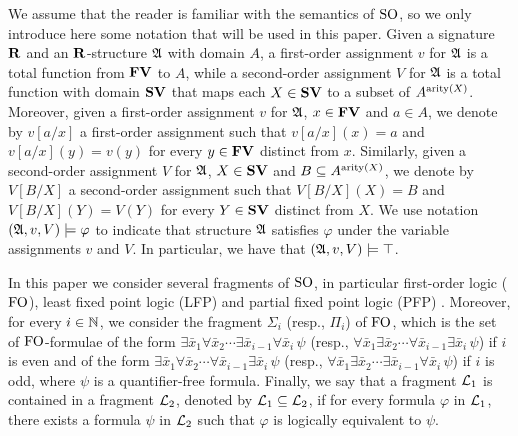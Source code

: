 We assume that the reader is familiar with the semantics of ${\rm SO}$, so we only introduce here some notation that will be used in this paper. 
Given a signature $\mathbf{R}$ and an $\mathbf{R}$-structure $\mathfrak{A}$ with domain $A$, a first-order assignment $v$ for $\mathfrak{A}$ is a total function from $\mathbf{FV}$ to $A$, while a second-order assignment $V$ for $\mathfrak{A}$ is a total function with domain $\mathbf{SV}$ that maps each $X \in \mathbf{SV}$ to a subset of $A^{{\rm arity}(X)}$. Moreover, given a first-order assignment $v$ for $\mathfrak{A}$, $x \in \mathbf{FV}$ and $a \in A$, we denote by $v[a/x]$ a first-order assignment such that $v[a/x](x) = a$ and $v[a/x](y) = v(y)$ for every $y \in \mathbf{FV}$ distinct from $x$. Similarly, given a second-order assignment $V$ for $\mathfrak{A}$, $X \in \mathbf{SV}$ and $B  \subseteq A^{{\rm arity}(X)}$, we denote by $V[B/X]$ a second-order assignment such that $V[B/X](X) = B$ and $V[B/X](Y) = V(Y)$ for every $Y \in \mathbf{SV}$ distinct from $X$. We use notation $(\mathfrak{A}, v, V) \models \varphi$ to indicate that structure $\mathfrak{A}$ satisfies $\varphi$ under the variable assignments $v$ and $V$. In particular, we have that $(\mathfrak{A}, v, V) \models \top$. 

In this paper we consider several fragments of ${\rm SO}$, in particular first-order logic (${\rm FO}$), least fixed point logic (LFP) and partial fixed point logic (PFP) \cite{L04}. Moreover, for every $i \in \mathbb{N}$, we consider the fragment $\Sigma_i$ (resp., $\Pi_i$) of ${\rm FO}$, which is the set of ${\rm FO}$-formulae of the form 
$\exists \bar x_1 \forall \bar x_2 \cdots \exists \bar x_{i-1} \forall \bar x_{i} \, \psi$ (resp., 
$\forall \bar x_1 \exists \bar x_2 \cdots \forall \bar x_{i-1} \exists \bar x_{i} \, \psi$) if $i$ is even and of the form
$\exists \bar x_1 \forall \bar x_2 \cdots \forall \bar x_{i-1} \exists \bar x_{i} \, \psi$ (resp., 
$\forall \bar x_1 \exists \bar x_2 \cdots \exists \bar x_{i-1} \forall \bar x_{i} \, \psi$) if $i$ is odd, where $\psi$ is a quantifier-free formula. Finally, we say that a fragment $\L_1$ is contained in a fragment $\L_2$, denoted by $\L_1 \subseteq \L_2$, if for every formula $\varphi$ in $\L_1$, there exists a formula $\psi$ in $\L_2$ such that $\varphi$ is logically equivalent to $\psi$. 




